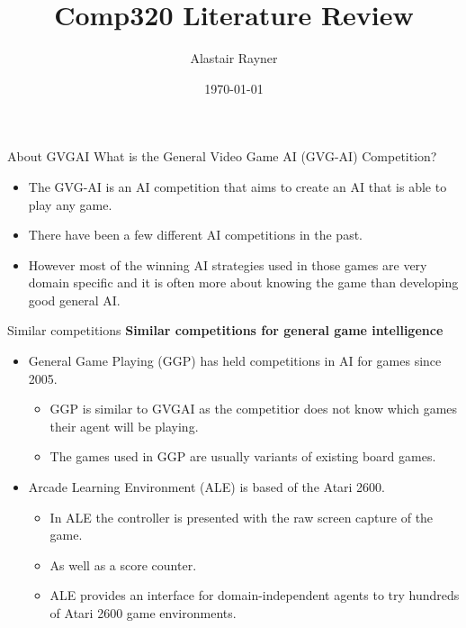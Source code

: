 \documentclass{beamer}
\title{Comp320 Literature Review}
\author{Alastair Rayner}
\date{\today}
\begin{document}
\maketitle


\begin{frame}{About GVGAI}
	  What is the General Video Game AI (GVG-AI) Competition? \pause
	  \begin{itemize}
	      \item The GVG-AI is an AI competition that aims to create an AI that is able to play any game. \pause
	      \item There have been a few different AI competitions in the past. \pause
	      \item However most of the winning AI strategies used in those games are very domain specific and it is often more about knowing the game than developing good general AI. \pause
	  \end{itemize}
\end{frame}


\begin{frame}{Similar competitions}	
	\textbf{Similar competitions for general game intelligence} \pause
		\begin{itemize}
			\item General Game Playing (GGP) has held competitions in AI for games since 2005. \pause
			\begin{itemize}
				\item GGP is similar to GVGAI as the competitior does not know which games their agent will be playing. \pause
				\item The games used in GGP are usually variants of existing board games. \pause
			\end{itemize}
			\item Arcade Learning Environment (ALE) is based of the Atari 2600. \pause
			\begin{itemize}
				\item In ALE the controller is presented with the raw screen capture of the game. \pause
				\item As well as a score counter.
				\item ALE provides an interface for domain-independent agents to try hundreds of Atari 2600 game environments. \pause
			\end{itemize}
		\end{itemize}
\end{frame}
\end{document}
